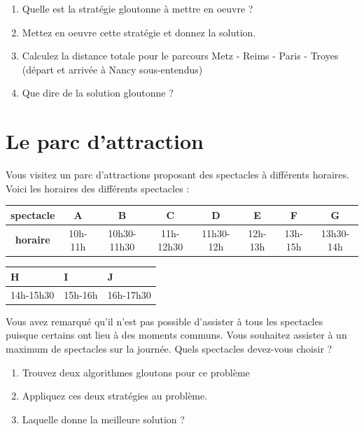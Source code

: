 \documentclass{article}[12pt]
\begin{document}
\begin{enumerate}
    \item Quelle est la stratégie gloutonne à mettre en oeuvre ?
    \item Mettez en oeuvre cette stratégie et donnez la solution.
    \item  Calculez la distance totale pour le parcours Metz - Reims - Paris - Troyes (départ et arrivée à Nancy sous-entendus)
    \item Que dire de la solution gloutonne ?
\end{enumerate}
    
\section*{Le parc d'attraction}
    
Vous visitez un parc d'attractions proposant des spectacles à différents horaires. Voici les horaires des différents spectacles :

\begin{table}[h!]
\begin{tabular}{|c|c|c|c|c|c|c|c}
\hline
\textbf{spectacle} & \textbf{A} & \textbf{B}  & \textbf{C} & \textbf{D} & \textbf{E} & \textbf{F} & \textbf{G} \\ \hline
\textbf{horaire}   & 10h-11h    & 10h30-11h30 & 11h-12h30  & 11h30-12h  & 12h-13h    & 13h-15h    & 13h30-14h  \\ \hline
\end{tabular}
\end{table}

\begin{table}[h!]
\centering
\begin{tabular}{l|l|l|}
\hline
\textbf{H} & \textbf{I} & \textbf{J} \\ \hline
14h-15h30  & 15h-16h    & 16h-17h30  \\ \hline
\end{tabular}
\end{table}

Vous avez remarqué qu'il n'est pas possible d'assister à tous les spectacles puisque certains ont lieu à des moments communs. Vous souhaitez assister à un maximum de spectacles sur la journée. Quels spectacles devez-vous choisir ?

    \begin{enumerate}
        \item Trouvez deux algorithmes gloutons pour ce problème
        \item Appliquez ces deux stratégies au problème.
        \item Laquelle donne la meilleure solution ?
    \end{enumerate}
    
\end{document}
